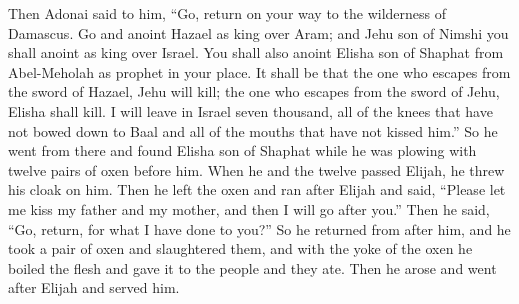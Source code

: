 \begin{biblechapter}
\verse Then Adonai said to him, “Go, return on your way to the wilderness of Damascus. Go and anoint Hazael as king over Aram;
\verse and Jehu son of Nimshi you shall anoint as king over Israel. You shall also anoint Elisha son of Shaphat from Abel-Meholah as prophet in your place.
\verse It shall be that the one who escapes from the sword of Hazael, Jehu will kill; the one who escapes from the sword of Jehu, Elisha shall kill.
\verse I will leave in Israel seven thousand, all of the knees that have not bowed down to Baal and all of the mouths that have not kissed him.”
\verse So he went from there and found Elisha son of Shaphat while he was plowing with twelve pairs of oxen before him. When he and the twelve passed Elijah, he threw his cloak on him.
\verse Then he left the oxen and ran after Elijah and said, “Please let me kiss my father and my mother, and then I will go after you.” Then he said, “Go, return, for what I have done to you?”
\verse So he returned from after him, and he took a pair of oxen and slaughtered them, and with the yoke of the oxen he boiled the flesh and gave it to the people and they ate. Then he arose and went after Elijah and served him.
\end{biblechapter}

